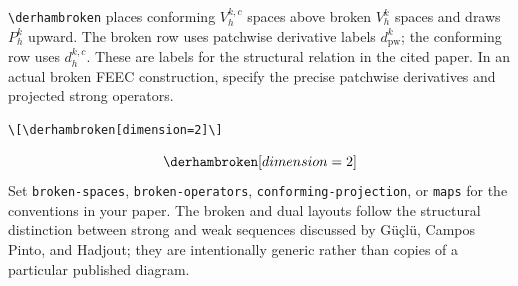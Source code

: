 \documentclass[11pt,a4paper]{article}
\newcommand\opt[1]{\texttt{#1}}
\begin{document}
\verb|\derhambroken| places conforming $V_h^{k,c}$ spaces above broken $V_h^k$ spaces and draws $P_h^k$ upward. The broken row uses patchwise derivative labels $d_{\mathrm{pw}}^k$; the conforming row uses $d_h^{k,c}$. These are labels for the structural relation in the cited paper. In an actual broken FEEC construction, specify the precise patchwise derivatives and projected strong operators.
\begin{verbatim}
\[\derhambroken[dimension=2]\]
\end{verbatim}
\[\derhambroken[dimension=2]\]
Set \opt{broken-spaces}, \opt{broken-operators}, \opt{conforming-projection}, or \opt{maps} for the conventions in your paper. The broken and dual layouts follow the structural distinction between strong and weak sequences discussed by Güçlü, Campos Pinto, and Hadjout; they are intentionally generic rather than copies of a particular published diagram.
\end{document}
